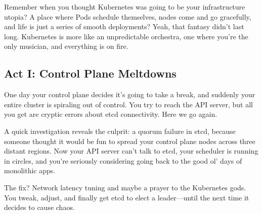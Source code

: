\documentclass{article}
\begin{document}
Remember when you thought Kubernetes was going to be your infrastructure utopia? A place where Pods schedule themselves, nodes come and go gracefully, and life is just a series of smooth deployments? Yeah, that fantasy didn’t last long. Kubernetes is more like an unpredictable orchestra, one where you’re the only musician, and everything is on fire.

\subsection{Act I: Control Plane Meltdowns}

One day your control plane decides it’s going to take a break, and suddenly your entire cluster is spiraling out of control. You try to reach the API server, but all you get are cryptic errors about etcd connectivity. Here we go again.

A quick investigation reveals the culprit: a quorum failure in etcd, because someone thought it would be fun to spread your control plane nodes across three distant regions. Now your API server can’t talk to etcd, your scheduler is running in circles, and you’re seriously considering going back to the good ol' days of monolithic apps.

The fix? Network latency tuning and maybe a prayer to the Kubernetes gods. You tweak, adjust, and finally get etcd to elect a leader—until the next time it decides to cause chaos.
\end{document}
